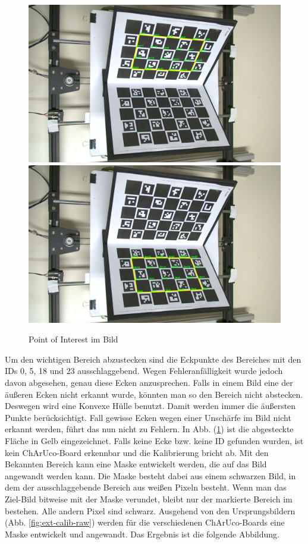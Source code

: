 		\begin{figure}[h]
			\centering
			\includegraphics[width=0.7\linewidth]{img/hauptteil/ext-calib/charuco_convex_hull_primary.png}
			\includegraphics[width=0.7\linewidth]{img/hauptteil/ext-calib/charuco_convex_hull_secondary.png}
			\caption{Point of Interest im Bild}
			\label{fig:ext-calib-hull}
		\end{figure}
	
		Um den wichtigen Bereich abzustecken sind die Eckpunkte des Bereiches mit den IDs 0, 5, 18 und 23 ausschlaggebend. Wegen Fehleranfälligkeit wurde jedoch davon abgesehen, genau diese Ecken anzusprechen. Falls in einem Bild eine der äußeren Ecken nicht erkannt wurde, könnten man so den Bereich nicht abstecken. Deswegen wird eine Konvexe Hülle benutzt. Damit werden immer die äußersten Punkte berücksichtigt. Fall gewisse Ecken wegen einer Unschärfe im Bild nicht erkannt werden, führt das nun nicht zu Fehlern. In Abb. (\ref{fig:ext-calib-hull}) ist die abgesteckte Fläche in Gelb eingezeichnet. Falls keine Ecke bzw. keine ID gefunden wurden, ist kein ChArUco-Board erkennbar und die Kalibrierung bricht ab. \newline
		Mit den Bekannten Bereich kann eine Maske entwickelt werden, die auf das Bild angewandt werden kann. Die Maske besteht dabei aus einem schwarzen Bild, in dem der ausschlaggebende Bereich aus weißen Pixeln besteht. Wenn man das Ziel-Bild bitweise mit der Maske verundet, bleibt nur der markierte Bereich im bestehen. Alle andern Pixel sind schwarz. Ausgehend von den Ursprungsbildern (Abb. \ref{fig:ext-calib-raw}) werden für die verschiedenen ChArUco-Boards eine Maske entwickelt und angewandt. Das Ergebnis ist die folgende Abbildung.
		
